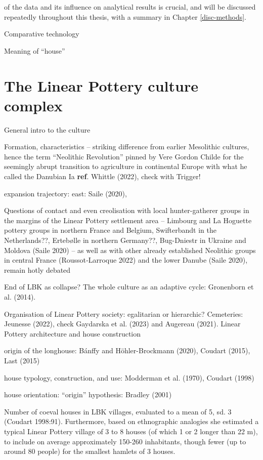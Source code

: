 \documentclass[
  12pt,
]{book}
\begin{document}
of the data and its influence on analytical results is crucial, and will be discussed repeatedly throughout this thesis, with a summary in Chapter \ref{disc-methods}.

Comparative technology

Meaning of ``house''

\hypertarget{lbk}{%
\section{The Linear Pottery culture complex}\label{lbk}}

General intro to the culture

Formation, characteristics -- striking difference from earlier Mesolithic cultures, hence the term ``Neolithic Revolution'' pinned by Vere Gordon Childe for the seemingly abrupt transition to agriculture in continental Europe with what he called the Danubian Ia \textbf{ref}. Whittle (2022), check with Trigger!

expansion trajectory: east: Saile (2020),

Questions of contact and even creolisation with local hunter-gatherer groups in the margins of the Linear Pottery settlement area -- Limbourg and La Hoguette pottery groups in northern France and Belgium, Swifterbandt in the Netherlands??, Ertebølle in northern Germany??, Bug-Dniestr in Ukraine and Moldova (Saile 2020) -- as well as with other already established Neolithic groups in central France (Roussot‑Larroque 2022) and the lower Danube (Saile 2020), remain hotly debated

End of LBK as collapse? The whole culture as an adaptive cycle: Gronenborn et al. (2014).

Organisation of Linear Pottery society: egalitarian or hierarchic? Cemeteries: Jeunesse (2022), check Gaydarska et al. (2023) and Augereau (2021). Linear Pottery architecture and house construction

origin of the longhouse: Bánffy and Höhler-Brockmann (2020), Coudart (2015), Last (2015)

house typology, construction, and use: Modderman et al. (1970), Coudart (1998)

house orientation: ``origin'' hypothesis: Bradley (2001)

Number of coeval houses in LBK villages, evaluated to a mean of 5, sd. 3 (Coudart 1998:91). Furthermore, based on ethnographic analogies she estimated a typical Linear Pottery village of 3 to 8 houses (of which 1 or 2 longer than 22 m), to include on average approximately 150-260 inhabitants, though fewer (up to around 80 people) for the smallest hamlets of 3 houses.
\end{document}
